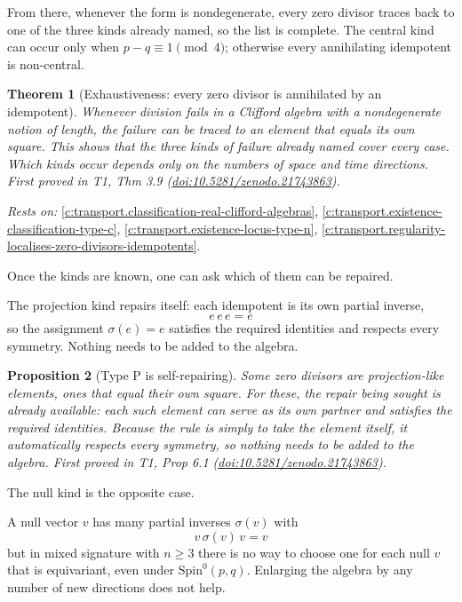\documentclass[11pt]{article}
\newtheorem{theorem}{Theorem}[section]
\newtheorem{proposition}[theorem]{Proposition}
\theoremstyle{definition}
\theoremstyle{plain}
\providecommand{\Spin}{}\renewcommand{\Spin}{\mathrm{Spin}}
\begin{document}
From there, whenever the form is nondegenerate, every zero divisor traces back to one of the three kinds already named, so the list is complete. The central kind can occur only when $p - q \equiv 1 \pmod 4$; otherwise every annihilating idempotent is non-central.

\begin{theorem}[Exhaustiveness: every zero divisor is annihilated by an idempotent]\label{c:transport.exhaustiveness-every-zero-divisor-annihilated-idempotent}
Whenever division fails in a Clifford algebra with a nondegenerate notion of length, the failure can be traced to an element that equals its own square. This shows that the three kinds of failure already named cover every case. Which kinds occur depends only on the numbers of space and time directions.
\emph{First proved in} T1, Thm 3.9 (\href{https://doi.org/10.5281/zenodo.21743863}{doi:10.5281/zenodo.21743863}).
\end{theorem}
\noindent\emph{Rests on:} \ref{c:transport.classification-real-clifford-algebras}, \ref{c:transport.existence-classification-type-c}, \ref{c:transport.existence-locus-type-n}, \ref{c:transport.regularity-localises-zero-divisors-idempotents}.

Once the kinds are known, one can ask which of them can be repaired.

The projection kind repairs itself: each idempotent is its own partial inverse, \[ e\,e\,e = e \] so the assignment $\sigma(e) = e$ satisfies the required identities and respects every symmetry. Nothing needs to be added to the algebra.

\begin{proposition}[Type P is self-repairing]\label{c:transport.type-p-self-repairing}
Some zero divisors are projection-like elements, ones that equal their own square. For these, the repair being sought is already available: each such element can serve as its own partner and satisfies the required identities. Because the rule is simply to take the element itself, it automatically respects every symmetry, so nothing needs to be added to the algebra.
\emph{First proved in} T1, Prop 6.1 (\href{https://doi.org/10.5281/zenodo.21743863}{doi:10.5281/zenodo.21743863}).
\end{proposition}

The null kind is the opposite case.

A null vector $v$ has many partial inverses $\sigma(v)$ with \[ v\,\sigma(v)\,v = v \] but in mixed signature with $n \geq 3$ there is no way to choose one for each null $v$ that is equivariant, even under $\Spin^0(p,q)$. Enlarging the algebra by any number of new directions does not help.
\end{document}

